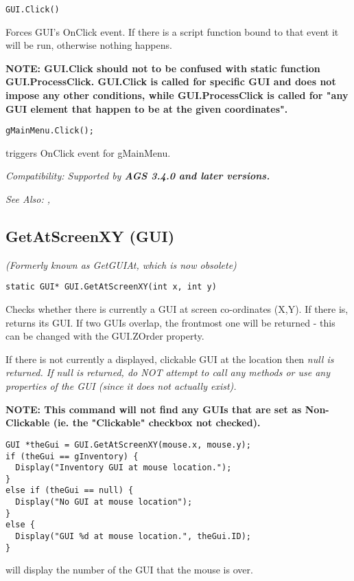 \begin{verbatim}
GUI.Click()
\end{verbatim}
Forces GUI's OnClick event. If there is a script function bound to that event it will be
run, otherwise nothing happens.

\bf{NOTE:} GUI.Click should not to be confused with \bf{static} function GUI.ProcessClick.
GUI.Click is called for specific GUI and does not impose any other conditions, while
GUI.ProcessClick is called for "any GUI element that happen to be at the given coordinates".

\begin{verbatim}
gMainMenu.Click();
\end{verbatim}
triggers OnClick event for gMainMenu.

\it{Compatibility:} Supported by \bf{AGS 3.4.0} and later versions.

\it{See Also:} ,


\subsection{GetAtScreenXY (GUI)}\label{GUI.GetAtScreenXY}%

\it{(Formerly known as GetGUIAt, which is now obsolete)}

\begin{verbatim}
static GUI* GUI.GetAtScreenXY(int x, int y)
\end{verbatim}
Checks whether there is currently a GUI at screen co-ordinates (X,Y). If
there is, returns its GUI. If two GUIs overlap, the frontmost one will
be returned - this can be changed with the GUI.ZOrder property.

If there is not currently a displayed, clickable GUI at the location then
\it{null} is returned. If null is returned, do NOT attempt to call any methods
or use any properties of the GUI (since it does not actually exist).

\bf{NOTE:} This command will not find any GUIs that are set as Non-Clickable (ie.
the "Clickable" checkbox not checked).

\begin{verbatim}
GUI *theGui = GUI.GetAtScreenXY(mouse.x, mouse.y);
if (theGui == gInventory) {
  Display("Inventory GUI at mouse location.");
}
else if (theGui == null) {
  Display("No GUI at mouse location");
}
else {
  Display("GUI %d at mouse location.", theGui.ID);
}
\end{verbatim}
will display the number of the GUI that the mouse is over.

